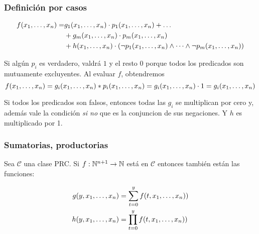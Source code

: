 	\subsubsection{Definición por casos}
\begin{demo}
	\vspace*{-0.5cm}
\begin{align*}
	f(x_1,\dots, x_{n}) = &g_1(x_1,\dots, x_{n})\cdot p_1(x_1,\dots, x_{n}) + \dots \\ &+ g_m(x_1,\dots, x_{n})\cdot p_m(x_1,\dots, x_{n}) \\ &+ h(x_1,\dots, x_{n})\cdot(\lnot p_1(x_1,\dots, x_{n})\land\cdots\land \lnot p_m(x_1,\dots, x_{n}))
\end{align*}

Si algún $p_i$ es verdadero, valdrá $1$ y el resto $0$ porque todos los predicados son mutuamente excluyentes. Al evaluar $f$, obtendremos $$f(x_1,\dots, x_{n}) = g_i(x_1,\dots, x_{n})*p_i(x_1,\dots, x_{n}) = g_i(x_1,\dots, x_{n})\cdot 1 = g_i(x_1,\dots, x_{n})$$

Si todos los predicados son falsos, entonces todas las $g_i$ se multiplican por cero y, además vale la condición \textit{si no} que es la conjuncion de sus negaciones. Y $h$ es multiplicado por 1.
\end{demo}

\subsubsection{Sumatorias, productorias}\label{sec::primitivas::sumatoria}

\begin{teorema}
Sea $\mathcal{C}$ una clase PRC. Si $f:\mathbb{N}^{n+1}\to\mathbb{N}$ está en $\mathcal{C}$ entonces también están las funciones:

\begin{align*}
	g(y,x_1,\dots, x_{n}) &= \sum_{t=0}^{y} f(t,x_1,\dots, x_{n})) \\
	h(y,x_1,\dots, x_{n}) &= \prod_{t=0}^{y} f(t,x_1,\dots, x_{n})) \\
\end{align*}

\end{teorema}

